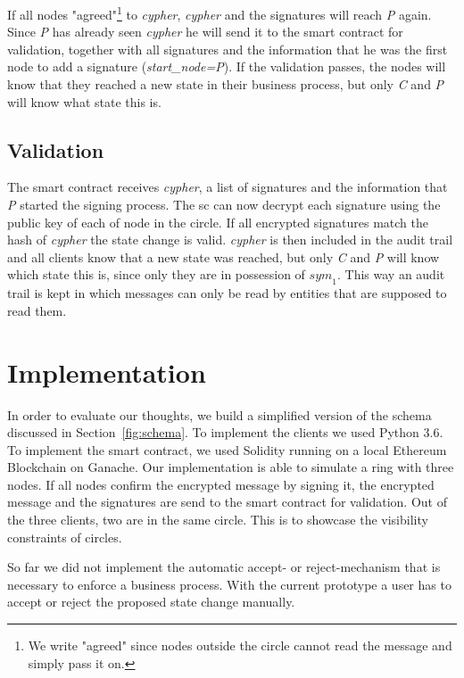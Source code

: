 \documentclass[runningheads]{llncs}
\newcommand{\ber}[1]{\textit{#1}}
\newcommand{\refsec}[1]{Section~\ref{#1}}
\begin{document}
If all nodes "agreed"\footnote{We write "agreed" since nodes outside the circle cannot read the message and simply pass it on.} to \ber{cypher}, \ber{cypher} and the signatures will reach \ber{P} again. Since \ber{P} has already seen \ber{cypher} he will send it to the smart contract for validation, together with all signatures and the information that he was the first node to add a signature (\ber{start\_node=P}). If the validation passes, the nodes will know that they reached a new state in their business process, but only \ber{C} and \ber{P} will know what state this is.



\subsection{Validation} \label{subsec:furtherinfo}

The smart contract receives \ber{cypher}, a list of signatures and the information that \ber{P} started the signing process. The sc can now decrypt each signature using the public key of each of node in the circle. If all encrypted signatures match the hash of \ber{cypher} the state change is valid. \ber{cypher} is then included in the audit trail and all clients know that a new state was reached, but only \ber{C} and \ber{P} will know which state this is, since only they are in possession of ${sym}_1$. This way an audit trail is kept in which messages can only be read by entities that are supposed to read them.


\section{Implementation} \label{sec:eval}


In order to evaluate our thoughts, we build a simplified version of the schema discussed in \refsec{fig:schema}. To implement the clients we used Python 3.6. To implement the smart contract, we used Solidity running on a local Ethereum Blockchain on Ganache. Our implementation is able to simulate a ring with three nodes. If all nodes confirm the encrypted message by signing it, the encrypted message and the signatures are send to the smart contract for validation. Out of the three clients, two are in the same circle. This is to showcase the visibility constraints of circles. 

So far we did not implement the automatic accept- or reject-mechanism that is necessary to enforce a business process. With the current prototype a user has to accept or reject the proposed state change manually. 
\end{document}

